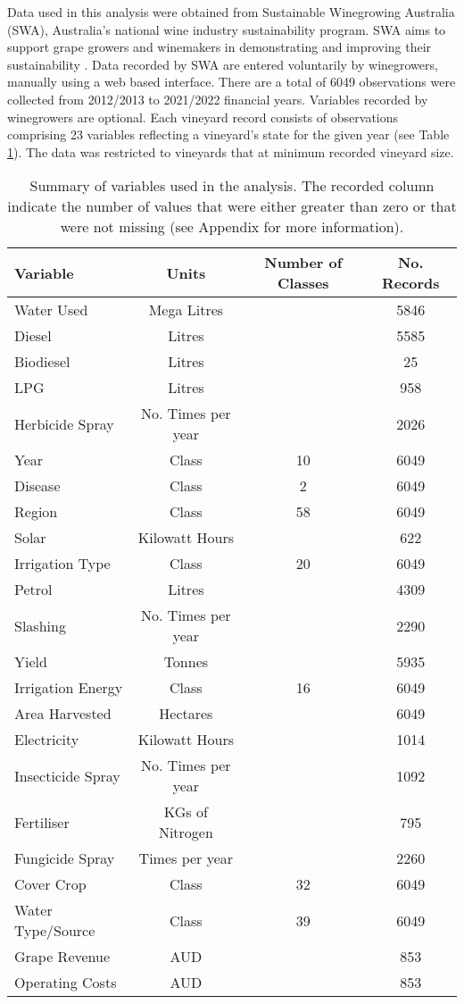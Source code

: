\documentclass[review,12pt,authoryear]{elsarticle}
\begin{document}
\begin{linenumbers}
Data used in this analysis were obtained from Sustainable Winegrowing Australia (SWA), Australia's national wine industry sustainability program. SWA aims to support grape growers and winemakers in demonstrating and improving their sustainability \citep{swaSustainableWingrowingAustralia2022}. Data recorded by SWA are entered voluntarily by winegrowers, manually using a web based interface. There are a total of 6049 observations were collected from 2012/2013 to 2021/2022 financial years. Variables recorded by winegrowers are optional. Each vineyard record consists of observations comprising 23 variables reflecting a vineyard's state for the given year (see Table \ref{tab:vars}). The data was restricted to vineyards that at minimum recorded vineyard size.
\par
\begin{table}[] 
\caption{Summary of variables used in the analysis. The recorded column indicate the number of values that were either greater than zero or that were not missing (see Appendix for more information).} \label{tab:vars}
 \small
  \begin{tabular}{@{}lccc@{}}
  \toprule
  \textbf{Variable} & \textbf{Units} & \textbf{Number of Classes} & \textbf{No. Records} \\ \midrule
  Water Used & Mega Litres &  & 5846 \\
  Diesel & Litres &  & 5585 \\
  Biodiesel & Litres &  & 25 \\
  LPG & Litres &  & 958 \\
  Herbicide Spray & No. Times per year &  & 2026 \\
  Year & Class & 10 & 6049 \\
  Disease & Class & 2 & 6049 \\
  Region & Class & 58 & 6049 \\
  Solar & Kilowatt Hours &  & 622 \\
  Irrigation Type & Class & 20 & 6049 \\
  Petrol & Litres &  & 4309 \\
  Slashing & No. Times per year &  & 2290 \\
  Yield & Tonnes &  & 5935 \\
  Irrigation Energy & Class & 16 & 6049 \\
  Area Harvested & Hectares &  & 6049 \\
  Electricity & Kilowatt Hours &  & 1014 \\
  Insecticide Spray & No. Times per year &  & 1092 \\
  Fertiliser & KGs of Nitrogen &  & 795 \\
  Fungicide Spray & Times per year &  & 2260 \\
  Cover Crop & Class & 32 & 6049 \\
  Water Type/Source & Class & 39 & 6049 \\
  Grape Revenue & AUD &  & 853 \\
  Operating Costs & AUD &  & 853 \\ \bottomrule
  \end{tabular}
\end{table}
\normalsize


\end{linenumbers}
\end{document}
